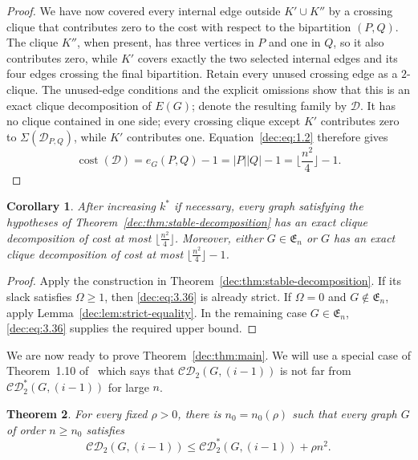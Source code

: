\documentclass[11pt]{article}
\numberwithin{equation}{section}
\newtheorem{theorem}{Theorem}[section]
\newtheorem{corollary}[theorem]{Corollary}
\theoremstyle{remark}
\DeclareMathOperator{\cost}{cost}
\newcommand{\CD}{\mathcal{CD}}
\newcommand{\CDstar}{\mathcal{CD}^{*}}
\begin{document}
\begin{proof}
We have now covered every internal edge outside \(K'\cup K''\) by a
crossing clique that contributes zero to the cost with respect to the bipartition \((P,Q)\).
The clique \(K''\), when present, has three vertices in \(P\) and one in \(Q\),
so it also contributes zero, while \(K'\) covers exactly the two selected
internal edges and its four edges crossing the final bipartition.  Retain
every unused crossing edge as a \(2\)-clique. The unused-edge conditions
and the explicit omissions show that this is an exact clique decomposition of \(E(G)\);
denote the resulting family by \(\mathcal D\). It has no clique contained
in one side; every crossing clique except \(K'\) contributes zero to \(\Sigma(\mathcal D_{P,Q})\),
while \(K'\) contributes one. Equation~\eqref{dec:eq:1.2} therefore gives
\begin{equation*}
 \cost(\mathcal D)
 =e_G(P,Q)-1
 =|P||Q|-1
 =\lfloor \frac{n^2}{4}\rfloor-1.
\end{equation*}
\end{proof}

\begin{corollary}
\label{dec:cor:strict-stable}
After increasing \(k^\ast\) if necessary, every graph satisfying the
hypotheses of Theorem~\ref{dec:thm:stable-decomposition} has an exact clique
decomposition of cost at most \(\lfloor \frac{n^2}{4}\rfloor\).
Moreover, either \(G\in\mathfrak E_{n}\) or \(G\) has an exact clique decomposition
of cost at most \(\lfloor \frac{n^2}{4}\rfloor-1\).
\end{corollary}

\begin{proof}
Apply the construction in Theorem~\ref{dec:thm:stable-decomposition}. 
If its slack satisfies \(\Omega\ge1\), then \eqref{dec:eq:3.36} is already strict.
If \(\Omega=0\) and \(G\notin\mathfrak E_{n}\), apply Lemma~\ref{dec:lem:strict-equality}.
In the remaining case \(G\in\mathfrak E_{n}\), \eqref{dec:eq:3.36} supplies the required upper bound.
\end{proof}

We are now ready to prove Theorem~\ref{dec:thm:main}. We will use a special case of
Theorem~1.10 of~\cite{BHKNW} which says that \(\CD_2(G,(i-1))\) is not far
from \(\CDstar_2(G,(i-1))\) for large \(n\).
\begin{theorem}
  \label{dec:thm:BHKNW}
For every fixed \(\rho>0\), there is \(n_0=n_0(\rho)\) such that every
graph \(G\) of order \(n\ge n_0\) satisfies
\begin{equation*}
  \CD_2(G,(i-1))\le \CDstar_2(G,(i-1))+\rho n^2.
\end{equation*}
\end{theorem}
\end{document}
